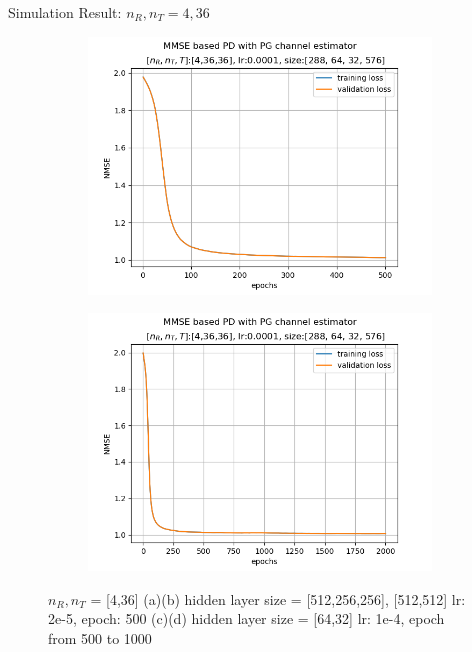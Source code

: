 \documentclass[hyperref={bookmarks=false}]{beamer}
\numberwithin{figure}{section}
\begin{document}
\begin{frame}{Simulation Result: $n_R, n_T = 4, 36$}
\begin{figure}[h!]
\begin{subfigure}[b]{0.33\linewidth}
    \end{subfigure}
    \begin{subfigure}[b]{0.33\linewidth}
      \includegraphics[width=\linewidth]{240502/figure_1_0.0001_[288, 64, 32, 576]_ep500.png}
    \end{subfigure}
    \begin{subfigure}[b]{0.33\linewidth}
      \includegraphics[width=\linewidth]{240502/figure_1_lr0.0001_[288, 64, 32, 576]_ep2000.png}
    \end{subfigure}
    \caption{$n_R, n_T$ = [4,36] 
        (a)(b) hidden layer size = [512,256,256], [512,512] lr: 2e-5, epoch: 500
        (c)(d) hidden layer size = [64,32] lr: 1e-4, epoch from 500 to 1000}
    \label{fig:4_36}
\end{figure}

\end{frame}
\end{document}
